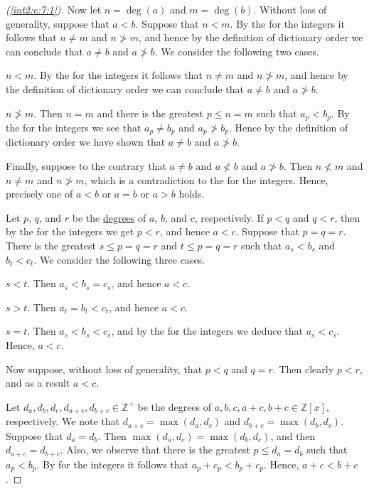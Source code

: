\begin{proof}[(\ref{int2:e:7:1})]
	Now let $n = \deg(a)$ and $m = \deg(b)$. Without loss of generality, suppose that $a < b$. Suppose that $n < m$. By the  for the integers it follows that $n \not= m$ and $n \not> m$, and hence by the definition of dictionary order we can conclude that $a \not= b$ and $a \not> b$. We consider the following two cases.
	\begin{bycases}
		\item $n < m$. By the  for the integers it follows that $n \not= m$ and $n \not> m$, and hence by the definition of dictionary order we can conclude that $a \not= b$ and $a \not> b$.
		\item $n \not> m$. Then $n = m$ and there is the greatest $p \leq n = m$ such that $a_p < b_p$. By the  for the integers we see that $a_p \not= b_p$ and $a_p \not> b_p$. Hence by the definition of dictionary order we have shown that $a \not= b$ and $a \not> b$.
	\end{bycases}

	Finally, suppose to the contrary that $a \not= b$ and $a \not< b$ and $a \not> b$. Then $n \not< m$ and $n \not= m$ and $n \not> m$, which is a contradiction to the  for the integers. Hence, precisely one of $a < b$ or $a = b$ or $a > b$ holds.

	\PartProof{int2:e:7:oid:transitive}
	Let $p$, $q$, and $r$ be the \hyperref[int2:e:7:d:degree]{degrees} of $a$, $b$, and $c$, respectively. If $p < q$ and $q < r$, then by the  for the integers we get $p < r$, and hence $a < c$. Suppose that $p = q = r$. There is the greatest $s \leq p = q = r$ and $t \leq p = q = r$ such that $a_{s} < b_{s}$ and $b_{t} < c_{t}$. We consider the following three cases.
	\begin{bycases}
		\item $s < t$. Then $a_s < b_s = c_s$, and hence $a < c$.
		\item $s > t$. Then $a_t = b_t < c_t$, and hence $a < c$.
		\item $s = t$. Then $a_s < b_s < c_s$, and by the  for the integers we deduce that $a_s < c_s$. Hence, $a < c$.
	\end{bycases}

	Now suppose, without loss of generality, that $p < q$ and $q = r$. Then clearly $p < r$, and as a result $a < c$.

	Let $d_a, d_b, d_c, d_{a+c}, d_{b+c} \in \mathbb{Z}^{+}$ be the degrees of $a, b, c, a+c, b+c \in \mathbb{Z}[x]$, respectively. We note that $d_{a+c} = \max(d_a, d_c)$ and $d_{b+c} = \max(d_b, d_c)$. Suppose that $d_a = d_b$. Then $\max(d_a, d_c) = \max(d_b, d_c)$, and then $d_{a+c} = d_{b+c}$. Also, we observe that there is the greatest $p \leq d_a = d_b$ such that $a_p < b_p$. By  for the integers it follows that $a_p + c_p < b_p + c_p$. Hence, $a + c < b + c$.


\end{proof}
